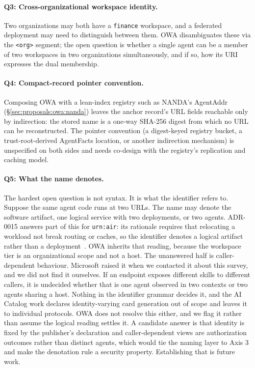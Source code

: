 \paragraph{Q3: Cross-organizational workspace identity.}
Two organizations may both have a \texttt{finance}
workspace, and a federated deployment may need to
distinguish between them. OWA disambiguates these via
the \texttt{<org>} segment; the open question is whether
a single agent can be a member of two workspaces in two
organizations simultaneously, and if so, how its URI
expresses the dual membership.

\paragraph{Q4: Compact-record pointer convention.}
Composing OWA with a lean-index registry such as
NANDA's AgentAddr~\cite{nanda_index}
(\S\ref{sec:proposals:owa:nanda}) leaves the anchor
record's URL fields reachable only by indirection: the
stored name is a one-way SHA-256 digest from which no
URL can be reconstructed. The pointer convention (a
digest-keyed registry bucket, a trust-root-derived
AgentFacts location, or another indirection mechanism)
is unspecified on both sides and needs co-design with
the registry's replication and caching model.

\paragraph{Q5: What the name denotes.}
The hardest open question is not syntax. It is what the
identifier refers to. Suppose the same agent code runs at
two URLs. The name may denote the software artifact, one
logical service with two deployments, or two agents.
ADR-0015 answers part of this for \texttt{urn:air}: its
rationale requires that relocating a workload not break
routing or caches, so the identifier denotes a logical
artifact rather than a deployment~\cite{ai_catalog}. OWA
inherits that reading, because the workspace tier is an
organizational scope and not a host. The unanswered half is
caller-dependent behaviour. Microsoft raised it when we
contacted it about this survey, and we did not find it
ourselves. If an endpoint exposes
different skills to different callers, it is undecided
whether that is one agent observed in two contexts or two
agents sharing a host. Nothing in the identifier grammar
decides it, and the AI Catalog work declares
identity-varying card generation out of scope and leaves it
to individual protocols. OWA does not resolve this either,
and we flag it rather than assume the logical reading
settles it. A candidate answer is that
identity is fixed by the publisher's declaration and
caller-dependent views are authorization outcomes rather
than distinct agents, which would tie the naming layer to
Axis 3 and make the denotation rule a security property.
Establishing that is future work.

